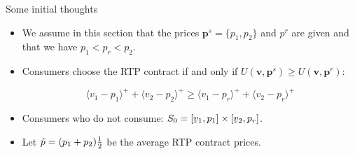 \documentclass{class}
\begin{document}

    


\begin{frame}{Some initial thoughts}

\begin{itemize}
    \item We assume in this section that the prices $\textbf{p}^s = \{ p_1 , p_2 \}$ and ${p}^r $ are given and that we have $p_1 < p_r < p_2$.
    
    \vfill
    
    \item Consumers choose the RTP contract if and only if $U(\textbf{v},\textbf{p}^s)\geq U(\textbf{v},\textbf{p}^r)$:

    \vfill
    
\begin{equation*}
 \langle v_1-p_1 \rangle^+ + \langle v_2-p_2 \rangle^+ \geq \langle v_1-p_r \rangle^+ + \langle v_2-p_r \rangle^+
\end{equation*}

\vfill

\item Consumers who do not consume: $S_0 = [\ubar{v}_1,p_1]\times[\ubar{v}_2,p_r]$.

\vfill

\item Let $\Tilde{p} = (p_1 + p_2)\frac{1}{2}$ be the average RTP contract prices.

\end{itemize}

    
\end{frame}

\end{document}

